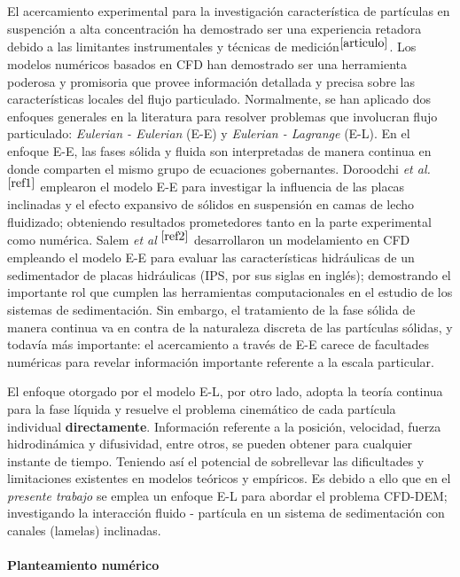 El acercamiento experimental para la investigaci\'on caracter\'istica de part\'iculas en suspenci\'on a alta concentraci\'on ha demostrado ser una experiencia retadora debido a las limitantes instrumentales y t\'ecnicas de medici\'on$^{\cite{articulo}}$. Los modelos num\'ericos basados en CFD han demostrado ser una herramienta poderosa y promisoria que provee informaci\'on detallada y precisa sobre las caracter\'isticas locales del flujo particulado. Normalmente, se han aplicado dos enfoques generales en la literatura para resolver problemas que involucran flujo particulado: \textit{Eulerian - Eulerian} (E-E) y \textit{Eulerian - Lagrange} (E-L). En el enfoque E-E, las fases s\'olida y fluida son interpretadas de manera continua en donde comparten el mismo grupo de ecuaciones gobernantes. Doroodchi \textit{et al.}$^{\cite{ref1}}$ emplearon el modelo E-E para investigar la influencia de las placas inclinadas y el efecto expansivo de s\'olidos en suspensi\'on en camas de lecho fluidizado; obteniendo resultados prometedores tanto en la parte experimental como num\'erica. Salem \textit{et al} $^{\cite{ref2}}$ desarrollaron un modelamiento en CFD empleando el modelo E-E para evaluar las caracter\'isticas hidr\'aulicas de un sedimentador de placas hidr\'aulicas (IPS, por sus siglas en ingl\'es); demostrando el importante rol que cumplen las herramientas computacionales en el estudio de los sistemas de sedimentaci\'on. Sin embargo, el tratamiento de la fase s\'olida de manera continua va en contra de la naturaleza discreta de las part\'iculas s\'olidas, y todav\'ia m\'as importante: el acercamiento a trav\'es de E-E carece de facultades num\'ericas para revelar informaci\'on importante referente a la escala particular.

\noindent
\justify

El enfoque otorgado por el modelo E-L, por otro lado, adopta la teor\'ia continua para la fase l\'iquida y resuelve el problema cinem\'atico de cada part\'icula individual \textbf{directamente}. Informaci\'on referente a la posici\'on, velocidad, fuerza hidrodin\'amica y difusividad, entre otros, se pueden obtener para cualquier instante de tiempo. Teniendo as\'i el potencial de sobrellevar las dificultades y limitaciones existentes en modelos te\'oricos y emp\'iricos. Es debido a ello que en el \textit{presente trabajo} se emplea un enfoque E-L para abordar el problema CFD-DEM; investigando la interacci\'on fluido - part\'icula en un sistema de sedimentaci\'on con canales (lamelas) inclinadas.

\paragraph{Planteamiento num\'erico}

